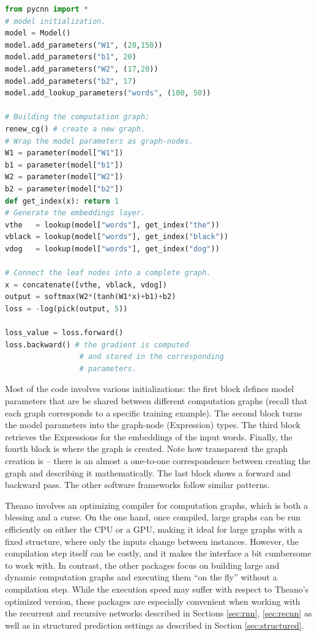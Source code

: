 \documentclass[jair,twoside,11pt,theapa]{article}
\begin{document}
{\begin{lstlisting}[language=python]
from pycnn import *
# model initialization.
model = Model()
model.add_parameters("W1", (20,150))
model.add_parameters("b1", 20)
model.add_parameters("W2", (17,20))
model.add_parameters("b2", 17)
model.add_lookup_parameters("words", (100, 50))

# Building the computation graph:
renew_cg() # create a new graph.
# Wrap the model parameters as graph-nodes.
W1 = parameter(model["W1"])
b1 = parameter(model["b1"])
W2 = parameter(model["W2"])
b2 = parameter(model["b2"])
def get_index(x): return 1
# Generate the embeddings layer.
vthe   = lookup(model["words"], get_index("the"))
vblack = lookup(model["words"], get_index("black"))
vdog   = lookup(model["words"], get_index("dog"))

# Connect the leaf nodes into a complete graph.
x = concatenate([vthe, vblack, vdog])
output = softmax(W2*(tanh(W1*x)+b1)+b2)
loss = -log(pick(output, 5))

loss_value = loss.forward()
loss.backward() # the gradient is computed 
                 # and stored in the corresponding
                 # parameters.
\end{lstlisting}

\noindent Most of the code involves various initializations: the first block
defines model parameters that are be shared between different computation
graphs (recall that each graph corresponds to a specific training example).
The second block turns the model parameters into the graph-node
(Expression) types.  The third block retrieves the Expressions for the
embeddings of the input words.  Finally, the fourth block is where the graph
is created. Note how transparent the graph creation is -- there is an almost a
one-to-one correspondence between creating the graph and describing it
mathematically.  The last block shows a forward and backward pass.  
The other software frameworks follow similar patterns.

Theano involves an optimizing compiler for computation graphs, which is both a
blessing and a curse. On the one hand, once compiled, large graphs can be run
efficiently on either the CPU or a GPU, making it ideal for large graphs with a
fixed structure, where only the inputs change between instances. However, the
compilation step itself can be costly, and it makes the interface a bit
cumbersome to work with.  In contrast, the other packages focus on building
large and dynamic computation graphs and executing them ``on the fly'' without a
compilation step. While the execution speed may suffer with respect to Theano's
optimized version, these packages are especially convenient when working with
the recurrent and recursive networks described in Sections \ref{sec:rnn}, \ref{sec:recnn} as well
as in structured prediction settings as described in Section \ref{sec:structured}.

}
\end{document}

